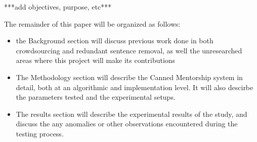 ***add objectives, purpose, etc***

The remainder of this paper will be organized as follows:
\begin{itemize}
	\item the Background section will discuss previous work done in both crowdsourcing and redundant sentence removal, as well the unresearched areas where this project will make its contributions
	
	\item The Methodology section will describe the Canned Mentorship system in detail, both at an algorithmic and implementation level. It will also descirbe the parameters tested and the experimental setups.
	
	\item The results section will describe the experimental results of the study, and discuss the any anomalies or other observations encountered during the testing process.
\end{itemize}
